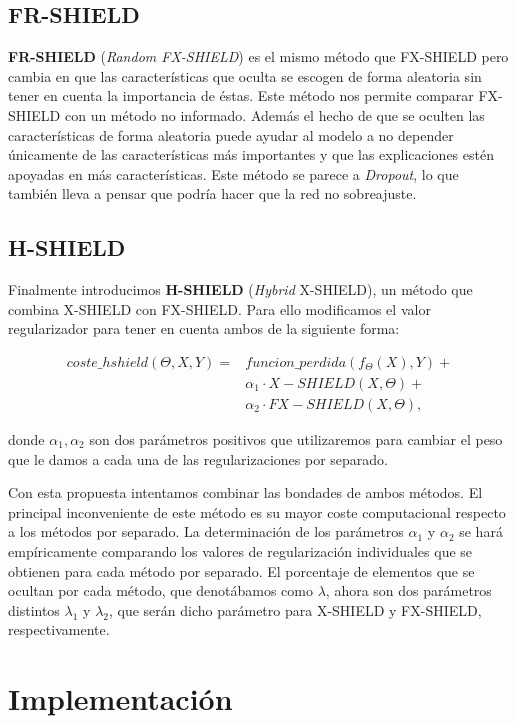 \subsection{FR-SHIELD}

\textbf{FR-SHIELD} (\textit{Random FX-SHIELD}) es el mismo método que FX-SHIELD pero cambia en que las características que oculta se escogen de forma aleatoria sin tener en cuenta la importancia de éstas. Este método nos permite comparar FX-SHIELD con un método no informado. Además el hecho de que se oculten las características de forma aleatoria puede ayudar al modelo a no depender únicamente de las características más importantes y que las explicaciones estén apoyadas en más características. Este método se parece a \textit{Dropout}, lo que también lleva a pensar que podría hacer que la red no sobreajuste.

\subsection{H-SHIELD}

Finalmente introducimos \textbf{H-SHIELD} (\textit{Hybrid} X-SHIELD), un método que combina X-SHIELD con FX-SHIELD. Para ello modificamos el valor regularizador para tener en cuenta ambos de la siguiente forma:

\begin{align*}
coste\_hshield(\Theta,X,Y) = &funcion\_perdida(f_\Theta(X),Y) + \\
&\alpha_1 \cdot X-SHIELD(X,\Theta) +\\
&\alpha_2 \cdot FX-SHIELD(X,\Theta),
\end{align*}

donde $\alpha_1, \alpha_2$ son dos parámetros positivos que utilizaremos para cambiar el peso que le damos a cada una de las regularizaciones por separado. 

Con esta propuesta intentamos combinar las bondades de ambos métodos. El principal inconveniente de este método es su mayor coste computacional respecto a los métodos por separado. La determinación de los parámetros $\alpha_1$ y $\alpha_2$ se hará empíricamente comparando los valores de regularización individuales que se obtienen para cada método por separado. El porcentaje de elementos que se ocultan por cada método, que denotábamos como $\lambda$, ahora son dos parámetros distintos $\lambda_1$ y $\lambda_2$, que serán dicho parámetro para X-SHIELD y FX-SHIELD, respectivamente.

\section{Implementación}

